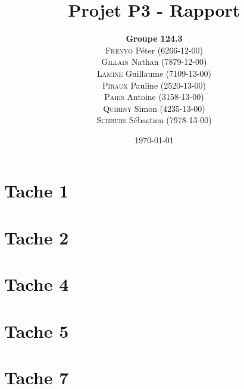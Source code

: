 \documentclass{report}
\title{Projet P3 - Rapport}
\author{\textbf{Groupe 124.3}\\
\textsc{Frenyo} Péter (6266-12-00)\\
\textsc{Gillain} Nathan (7879-12-00)\\
\textsc{Lamine} Guillaume (7109-13-00)\\
\textsc{Piraux} Pauline (2520-13-00)\\
\textsc{Paris} Antoine (3158-13-00)\\
\textsc{Quiriny} Simon (4235-13-00)\\
\textsc{Schrurs} Sébastien (7978-13-00)}
\date{\today}
\begin{document}
\maketitle
\tableofcontents

\chapter{Tache 1}

\chapter{Tache 2}

\chapter{Tache 4}

\chapter{Tache 5}

\chapter{Tache 7}




\nocite{*}
\end{document}
